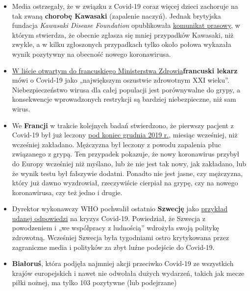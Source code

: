 \begin{itemize}
\tightlist
\item
  Media ostrzegały, że w związku z Covid-19 coraz więcej dzieci
  zachoruje na tak zwaną \textbf{chorobę Kawasaki} (zapalenie naczyń).
  Jednak brytyjska fundacja \emph{Kawasaki Disease Foundation}
  opublikowała
  \href{https://www.societi.org.uk/kawasaki-disease-and-covid-19/}{komunikat
  prasowy}, w którym stwierdza, że obecnie zgłasza się mniej przypadków
  Kawasaki, niż zwykle, a w kilku zgłoszonych przypadkach tylko około
  połowa wykazała wynik pozytywny na obecność nowego koronawirusa.
\item
  \href{https://covidinfos.net/covid19/la-lettre-dun-praticien-hospitalier-adressee-au-ministere-de-la-sante-denonce-une-arnaque-sanitaire/604/}{W
  liście otwartym do francuskiego Ministerstwa Zdrowia}\textbf{francuski
  lekarz} mówi o Covid-19 jako „największym oszustwie zdrowotnym XXI
  wieku''. Niebezpieczeństwo wirusa dla całej populacji jest
  porównywalne do grypy, a konsekwencje wprowadzonych restrykcji są
  bardziej niebezpieczne, niż sam wirus.
\item
  We \textbf{Francji} w trakcie kolejnych badań stwierdzono, że pierwszy
  pacjent z Covid-19 był już leczony
  \href{https://www.reuters.com/article/us-health-coronavirus-france-retests/frances-early-covid-19-case-may-hold-clues-to-pandemics-start-idUSKBN22H15R}{pod
  koniec grudnia 2019 r.}, miesiąc wcześniej, niż wcześniej zakładano.
  Mężczyzna był leczony z powodu zapalenia płuc związanego z grypą. Ten
  przypadek pokazuje, że nowy koronawirus przybył do Europy wcześniej
  niż myślano, lub że nie jest tak nowy, jak zakładano, lub że wynik
  testu był fałszywie dodatni. Ponadto nie jest jasne, czy mężczyzna,
  który już dawno wyzdrowiał, rzeczywiście cierpiał na grypę, czy na
  nowego koronawirusa, czy też jedno i drugie.
\item
  Dyrektor wykonawczy WHO pochwalił ostatnio \textbf{Szwecję} jako
  \href{https://nypost.com/2020/04/29/who-lauds-sweden-as-model-for-resisting-coronavirus-lockdown/}{przykład
  udanej odpowiedzi} na kryzys Covid-19. Powiedział, że Szwecja z
  powodzeniem i „we współpracy z ludnością'' wdrożyła swoją politykę
  zdrowotną. Wcześniej Szwecja była tygodniami ostro krytykowana przez
  zagraniczne media i polityków za zbyt luźne podejście do Covid-19.
\item
  \textbf{Białoruś}, która podjęła najmniej akcji przeciwko Covid-19 ze
  wszystkich krajów europejskich i nawet nie odwołała dużych wydarzeń,
  takich jak mecze piłki nożnej, ma tylko 103 pozytywne (lub podejrzane)

\end{itemize}
